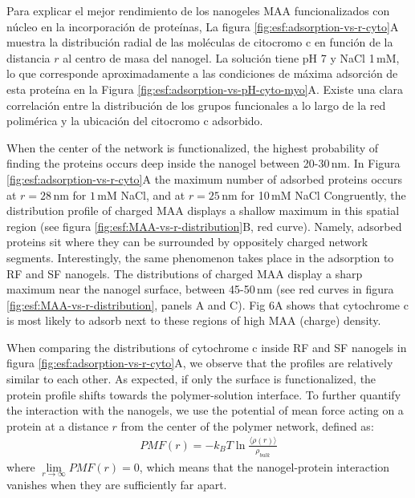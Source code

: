 Para explicar el mejor rendimiento de los nanogeles MAA funcionalizados con n\'ucleo en la incorporaci\'on de prote\'inas,
La figura \ref{fig:esf:adsorption-vs-r-cyto}A muestra la distribuci\'on radial de las mol\'eculas de citocromo c en funci\'on de la distancia $r$ al centro de masa del nanogel.
La soluci\'on tiene pH 7 y NaCl 1\,mM, lo que corresponde aproximadamente a las condiciones de m\'axima adsorci\'on de esta prote\'ina en la Figura \ref{fig:esf:adsorption-vs-pH-cyto-myo}A.
Existe una clara correlaci\'on entre la distribuci\'on de los grupos funcionales a lo largo de la red polim\'erica y la ubicaci\'on del citocromo c adsorbido.



When the center of the network is functionalized, the highest probability of finding the proteins occurs deep inside the nanogel between 20-30\,nm.
In Figura \ref{fig:esf:adsorption-vs-r-cyto}A the maximum number of adsorbed proteins occurs at $r=28$\,nm for $1$\,mM NaCl, and at $r=25$\,nm for 10\,mM NaCl%
Congruently, the distribution profile of charged MAA displays a shallow maximum in this spatial region (see figura \ref{fig:esf:MAA-vs-r-distribution}B, red curve).
Namely, adsorbed proteins sit where they can be surrounded by oppositely charged network segments.
Interestingly, the same phenomenon takes place in the adsorption to RF and SF nanogels.
The distributions of charged MAA display a sharp maximum near the nanogel surface, between 45-50\,nm (see red curves in  figura \ref{fig:esf:MAA-vs-r-distribution}, panels A and C).
Fig 6A shows that cytochrome c is most likely to adsorb next to these  regions of high MAA (charge) density.



When comparing the distributions of cytochrome c inside RF and SF nanogels in figura \ref{fig:esf:adsorption-vs-r-cyto}A, we observe that the profiles are relatively similar to each other.
As expected, if only the surface is functionalized, the protein profile shifts towards the polymer-solution interface.
To further quantify the interaction with the nanogels, we use the potential of mean force acting on a protein at a distance $r$ from the center of the polymer network, defined as:
\begin{align}
   {PMF} (r) = -k_B T \ln \frac{\langle \rho(r)\rangle}{\rho_{bulk}}
\end{align}
where $\lim\limits_{r\to \infty}{PMF}(r)=0$, which means that the nanogel-protein interaction vanishes when they are sufficiently far apart.





